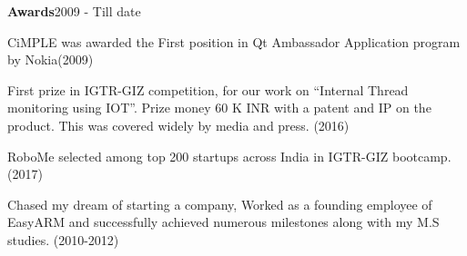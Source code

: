 \begin{center}
\textbf{Awards}\hfill {2009 - Till date}%
\end{center}
     
     \begin{itemize}
        {
        \item {CiMPLE was awarded the First position in Qt Ambassador Application program by Nokia(2009)}
        \item {First prize in IGTR-GIZ competition, for our work on “Internal Thread monitoring using IOT”.
        Prize money 60 K INR with a patent and IP on the product. This was covered widely by media
        and press. (2016)}
        \item {RoboMe selected among top 200 startups across India in IGTR-GIZ bootcamp. (2017)}
        \item {Chased my dream of starting a company, Worked as a founding employee of EasyARM and
        successfully achieved numerous milestones along with my M.S studies. (2010-2012)}
        }%

\end{itemize}
